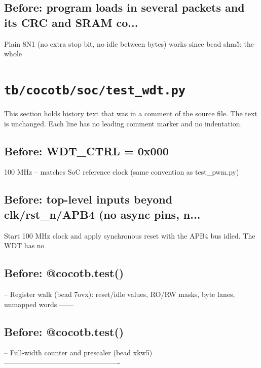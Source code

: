 \begin{record}
\subsection*{Before: program loads in several packets and its CRC and SRAM co...}

\begin{textblock}
Plain 8N1 (no extra stop bit, no idle between bytes) works since bead shm5: the whole
\end{textblock}

\end{record}

\section{\texttt{tb/cocotb/soc/test\_wdt.py}}\label{cr:suite:soc-test-wdt}

This section holds history text that was in a comment of the source file. The text is unchanged. Each line has no leading comment marker and no indentation.

\begin{record}

\subsection*{Before: WDT\_CTRL = 0x000}

\begin{textblock}
100 MHz -- matches SoC reference clock (same convention as test_pwm.py)
\end{textblock}

\subsection*{Before: top-level inputs beyond clk/rst\_n/APB4 (no async pins, n...}

\begin{textblock}
Start 100 MHz clock and apply synchronous reset with the APB4 bus idled. The WDT has no
\end{textblock}

\subsection*{Before: @cocotb.test()}

\begin{textblock}
-- Register walk (bead 7ovx): reset/idle values, RO/RW masks, byte lanes, unmapped words ------
\end{textblock}

\subsection*{Before: @cocotb.test()}

\begin{textblock}
-- Full-width counter and prescaler (bead xkw5) -------------------------------------------------
\end{textblock}

\end{record}

